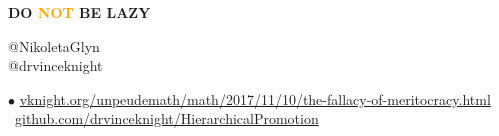 \documentclass{beamer}
\begin{document}
\begin{frame}
    \centering
    \LARGE \textbf{DO \textcolor{orange}{NOT} BE LAZY}
\end{frame}

\begin{frame}
    \begin{center}
    @NikoletaGlyn \\
    @drvinceknight
    \vspace{1cm}
    \end{center}

    \footnotesize
    $\bullet$ \url{vknight.org/unpeudemath/math/2017/11/10/the-fallacy-of-meritocracy.html} \\
    \faGithub  \ \url{github.com/drvinceknight/HierarchicalPromotion}
\end{frame}
\end{document}
